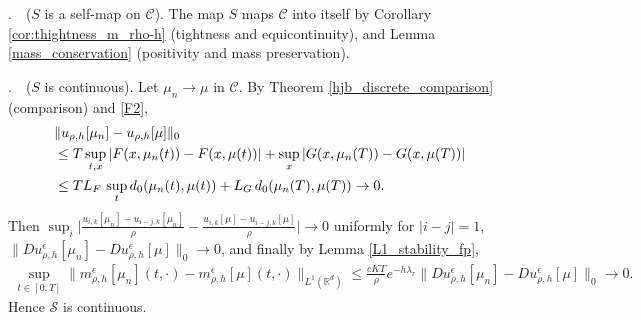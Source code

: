 \documentclass[a4paper,  twoside, 10pt, leqno]{amsart}
\newcommand{\R}{\mathbb{R}}
\theoremstyle{remark}
\theoremstyle{definition}
\begin{document}
.~~($S$ is a self-map on $\mathcal C$). The map $S$ maps $\mathcal{C}$ into itself by Corollary \ref{cor:thightness_m_rho-h} (tightness and equicontinuity),  and Lemma \ref{mass_conservation} (positivity and mass preservation). \smallskip %
\medskip 

.~~($S$ is continuous). Let $ \mu_{n} \to \mu$ in $\mathcal{C}$. By
Theorem \ref{hjb_discrete_comparison} (comparison)
and \ref{F2},
\begin{align*}
&\| u_{\rho,h} [ \mu_{n} ] - u_{\rho,h} [ \mu ]  \|_{0} \\
&  \leq T \sup_{  t,x   } | F ( x, \mu_{n} ( t ) ) - F ( x, \mu ( t ) ) |  \notag
+ \sup_{x} | G ( x, \mu_{n} ( T ) ) - G ( x, \mu ( T ) ) | \\ 
&\leq T L_{F} \, \sup_{t} d_{0} ( \mu_{n} ( t ) , \mu ( t ) ) + L_{G} \,  d_{0} ( \mu_{n} ( T ) , \mu ( T ) ) \to 0. \notag
\end{align*}
Then
$ 
\sup_{i} \big| \frac{u_{i,k} [ \mu_{n} ] - u_{i-j,k} [ \mu_{n} ]}{ \rho   } - 
\frac{u_{i,k} [ \mu ] - u_{i-j,k} [ \mu ]}{ \rho   } \big| \to 0$ 
uniformly for $| i-j | =   1 $, $\| Du_{\rho,h}^{\epsilon} [ \mu_{n} ] - Du_{\rho,h}^{\epsilon} [ \mu ]  \|_{0} \to 0 $, and finally by Lemma \ref{L1_stability_fp},
\begin{align*}
        \sup_{t \in  [ 0,T ]} \| m_{\rho,h}^{\epsilon} [ \mu_{n} ] ( t, \cdot ) - m_{\rho,h}^{\epsilon} [ \mu ] ( t,\cdot )   \|_{L^{1} ( \R^d )}
        \leq \frac{cKT}{\rho} e^{- h \lambda_{r}}  \| Du_{\rho,h}^{\epsilon} [ \mu_{n} ] 
        - Du_{\rho,h}^{\epsilon} [ \mu ]  \|_{0} \to 0.
\end{align*}
Hence $\mathcal{S}$ is continuous.

\end{document}
